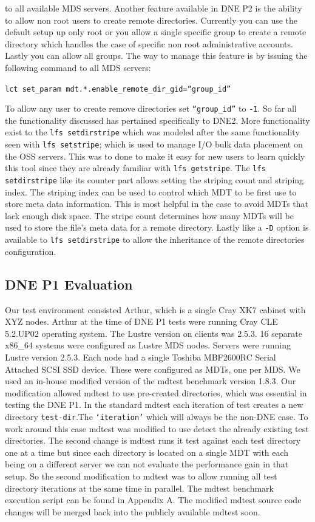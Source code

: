 \documentclass[conference,compsoc]{IEEEtran}
\def\code#1{\texttt{#1}}
\begin{document}
to all available MDS servers. Another feature available in DNE P2 is the
ability to allow non root users to create remote directories. Currently you can
use the default setup up only root or you allow a single specific group to
create a remote directory which handles the case of specific non root
administrative accounts. Lastly you can allow all groups. The way to manage
this feature is by issuing the following command to all MDS servers:

\code{lct set\_param mdt.*.enable\_remote\_dir\_gid=``group\_id''} 

To allow any user to create remove directories set \code{``group\_id''} to \code{-1}. So far all
the functionality discussed has pertained specifically to DNE2. More
functionality exist to the \code{lfs setdirstripe} which was modeled after the same
functionality seen with \code{lfs setstripe}; which is used to manage I/O bulk data
placement on the OSS servers. This was to done to make it easy for new users to
learn quickly this tool since they are already familiar with \code{lfs getstripe}. The
\code{lfs setdirstripe} like its counter part allows setting the striping count and
striping index. The striping index can be used to control which MDT to be first
use to store meta data information. This is most helpful in the case to avoid
MDTs that lack enough disk space. The stripe count determines how many MDTs
will be used to store the file's meta data for a remote directory. Lastly like
a \code{-D} option is available to \code{lfs setdirstripe} to allow the inheritance of the
remote directories configuration.




\subsection{DNE P1 Evaluation}

Our test environment consisted Arthur, which is a single Cray XK7 cabinet with
XYZ nodes. Arthur at the time of DNE P1 tests were running Cray CLE 5.2.UP02
operating system. The Lustre version on clients was 2.5.3. 16 separate x86\_64
systems were configured as Lustre MDS nodes. Servers were running Lustre
version 2.5.3. Each node had a single Toshiba MBF2600RC Serial Attached SCSI
SSD device. These were configured as MDTs, one per MDS.  We used an in-house
modified version of the mdtest benchmark version 1.8.3. Our modification
allowed mdtest to use pre-created directories, which was essential in testing
the DNE P1. In the standard mdtest each iteration of test creates a new
directory \code{test-dir}.The \code{`iteration'} which will always be the non-DNE case. To work
around this case mdtest was modified to use detect the already existing test
directories. The second change is mdtest runs it test against each test
directory one at  a time but since each directory is located on a single MDT
with each being on a different server we can not evaluate the performance gain
in that setup. So the second modification to mdtest was to allow running all
test directory iterations at the same time in parallel. The mdtest benchmark
execution script can be found in Appendix A. The modified mdtest source code
changes will be merged back into the publicly available mdtest soon.
\end{document}
